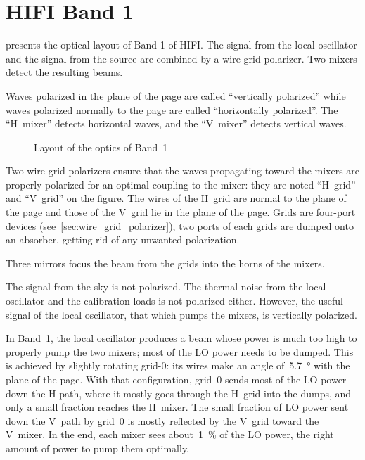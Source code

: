 \section{HIFI Band 1}
 presents the optical layout of Band 1 of HIFI.
The signal from the local oscillator and the signal from the source are combined by a wire grid polarizer.
Two mixers detect the resulting beams.

Waves polarized in the plane of the page are called ``vertically polarized'' while waves polarized normally to the page are called ``horizontally polarized''.
The ``H~mixer'' detects horizontal waves, and the ``V~mixer'' detects vertical waves.

\begin{figure}
    \centering
    \footnotesize
    
    \caption{Layout of the optics of Band~1}
    \label{fig:band1_layout}
\end{figure}

Two wire grid polarizers ensure that the waves propagating toward the mixers are properly polarized for an optimal coupling to the mixer: they are noted ``H~grid'' and ``V~grid'' on the figure.
The wires of the H~grid are normal to the plane of the page and those of the V~grid lie in the plane of the page.
Grids are four-port devices (see~\cref{sec:wire_grid_polarizer}), two ports of each grids are dumped onto an absorber, getting rid of any unwanted polarization.

Three mirrors focus the beam from the grids into the horns of the mixers.

The signal from the sky is not polarized.
The thermal noise from the local oscillator and the calibration loads is not polarized either.
However, the useful signal of the local oscillator, that which pumps the mixers, is vertically polarized.

In Band~1, the local oscillator produces a beam whose power is much too high to properly pump the two mixers; most of the LO power needs to be dumped.
This is achieved by slightly rotating grid-0: its wires make an angle of~\SI{5.7}{\degree} with the plane of the page.
With that configuration, grid~0 sends most of the LO power down the H path, where it mostly goes through the H~grid into the dumps, and only a small fraction reaches the H~mixer.
The small fraction of LO power sent down the V~path by grid~0 is mostly reflected by the V~grid toward the V~mixer.
In the end, each mixer sees about~\SI{1}{\percent} of the LO power, the right amount of power to pump them optimally.

